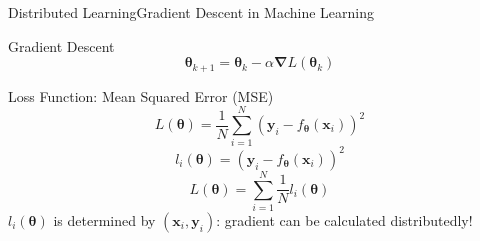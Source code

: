 \documentclass{beamer}
\begin{document}
\begin{frame}{Distributed Learning}{Gradient Descent in Machine Learning}

\begin{block}{Gradient Descent}
    \[\boldsymbol{\theta}_{k + 1} = \boldsymbol{\theta}_{k} - \alpha\boldsymbol{\nabla} L(\boldsymbol{\theta}_{k})\]
\end{block}
    
\begin{block}{Loss Function: Mean Squared Error (MSE)}
    \[L(\boldsymbol{\theta}) = \frac{1}{N}\sum_{i = 1}^{N} (\boldsymbol{y}_i - f_{\boldsymbol{\theta}}(\boldsymbol{x}_i))^2\]
    \[l_i(\boldsymbol{\theta}) = (\boldsymbol{y}_i - f_{\boldsymbol{\theta}}(\boldsymbol{x}_i))^2\]
    \[L(\boldsymbol{\theta}) = \sum_{i = 1}^{N} \frac{1}{N}l_i(\boldsymbol{\theta})\]
    $l_i(\boldsymbol{\theta})$ is determined by $(\boldsymbol{x}_i, \boldsymbol{y}_i)$: gradient can be calculated distributedly!
\end{block}

\end{frame}
\end{document}
